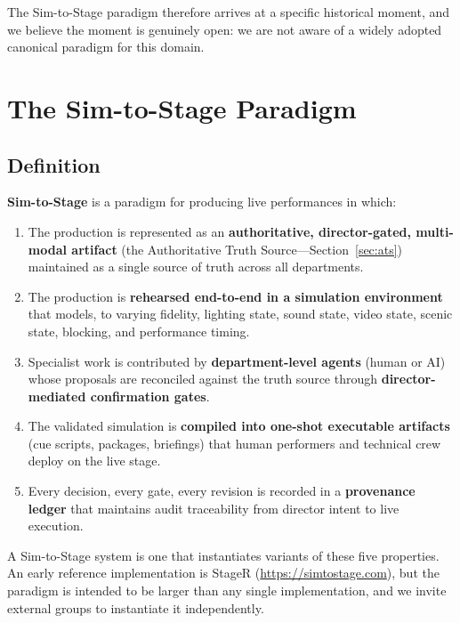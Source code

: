 \documentclass[11pt]{article}
\begin{document}
The Sim-to-Stage paradigm therefore arrives at a specific historical moment,
and we believe the moment is genuinely open: we are not aware of a widely
adopted canonical paradigm for this domain.

\section{The Sim-to-Stage Paradigm}
\label{sec:paradigm}

\subsection{Definition}

\textbf{Sim-to-Stage} is a paradigm for producing live performances in
which:

\begin{enumerate}
\item The production is represented as an \textbf{authoritative,
      director-gated, multi-modal artifact} (the Authoritative Truth
      Source---Section~\ref{sec:ats}) maintained as a single source of
      truth across all departments.
\item The production is \textbf{rehearsed end-to-end in a simulation
      environment} that models, to varying fidelity, lighting state, sound
      state, video state, scenic state, blocking, and performance timing.
\item Specialist work is contributed by \textbf{department-level agents}
      (human or AI) whose proposals are reconciled against the truth source
      through \textbf{director-mediated confirmation gates}.
\item The validated simulation is \textbf{compiled into one-shot executable
      artifacts} (cue scripts, packages, briefings) that human performers
      and technical crew deploy on the live stage.
\item Every decision, every gate, every revision is recorded in a
      \textbf{provenance ledger} that maintains audit traceability from
      director intent to live execution.
\end{enumerate}

A Sim-to-Stage system is one that instantiates variants of these five
properties.  An early reference implementation is StageR
(\url{https://simtostage.com}), but the paradigm is intended to be larger
than any single implementation, and we invite external groups to
instantiate it independently.
\end{document}
